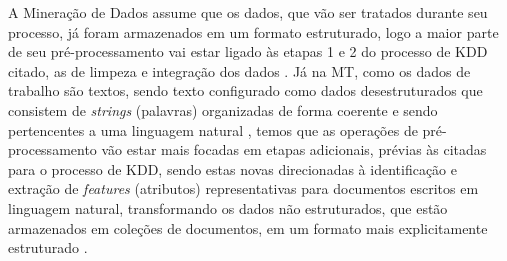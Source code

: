    A Mineração de Dados assume que os dados, que vão ser tratados durante seu processo, já foram armazenados em um formato estruturado, logo a maior parte de seu pré-processamento vai estar ligado às etapas 1 e 2 do processo de KDD citado, as de limpeza e integração dos dados \cite[p.~1]{Feldman:2006:TMH:1076381}. %
    Já na MT, como os dados de trabalho são textos, sendo texto configurado como dados desestruturados que consistem de \textit{strings} (palavras) organizadas de forma coerente e sendo pertencentes a uma linguagem natural \cite[p.~1]{Jo2018TMCIBDC}, temos que as operações de pré-processamento vão estar mais focadas em etapas adicionais, prévias às citadas para o processo de KDD, sendo estas novas direcionadas à identificação e extração de \textit{features} (atributos) representativas para documentos escritos em linguagem natural, transformando os dados não estruturados, que estão armazenados em coleções de documentos, em um formato mais explicitamente estruturado \cite[p.~1]{Feldman:2006:TMH:1076381}.
    
    
    
    
